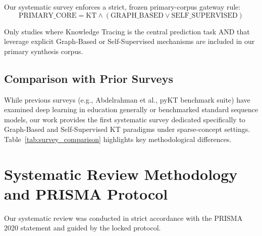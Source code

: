 \documentclass[10pt,journal,compsoc]{IEEEtran}
\begin{document}
Our systematic survey enforces a strict, frozen primary-corpus gateway rule:
\begin{equation}
\text{PRIMARY\_CORE} = \text{KT} \land (\text{GRAPH\_BASED} \lor \text{SELF\_SUPERVISED})
\end{equation}

Only studies where Knowledge Tracing is the central prediction task AND that leverage explicit Graph-Based or Self-Supervised mechanisms are included in our primary synthesis corpus.

\subsection{Comparison with Prior Surveys}
While previous surveys (e.g., Abdelrahman et al., pyKT benchmark suite) have examined deep learning in education generally or benchmarked standard sequence models, our work provides the first systematic survey dedicated specifically to Graph-Based and Self-Supervised KT paradigms under sparse-concept settings. Table~\ref{tab:survey_comparison} highlights key methodological differences.

\begin{table}[h]
\caption{Comparison with Prior Knowledge Tracing Surveys}
\label{tab:survey_comparison}
\centering
{}
\end{table}

\section{Systematic Review Methodology and PRISMA Protocol}
Our systematic review was conducted in strict accordance with the PRISMA 2020 statement and guided by the locked protocol.
\end{document}
